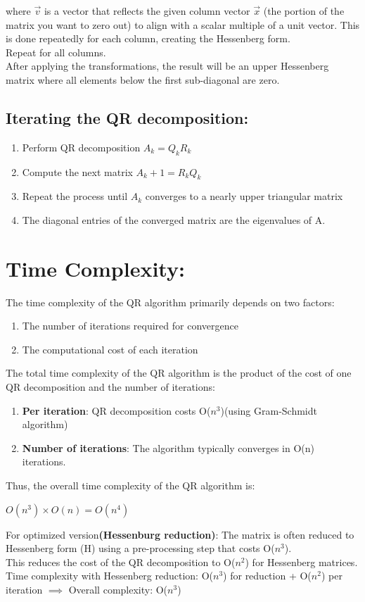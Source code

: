 \documentclass[journal]{IEEEtran}
\begin{document}
where $\vec{v}$ is a vector that reflects the given column vector $\vec{x}$ (the portion of the matrix you want to zero out) to align with a scalar multiple of a unit vector. This is done repeatedly for each column, creating the Hessenberg form.\\
Repeat for all columns.\\
After applying the transformations, the result will be an upper Hessenberg matrix where all elements below the first sub-diagonal are zero.\\


\subsection{Iterating the QR decomposition:}
\begin{enumerate}
    \item Perform QR decomposition $A_k=Q_kR_k$
    \item Compute the next matrix $A_k+1=R_kQ_k$
    \item Repeat the process until $A_k$ converges to a nearly upper triangular matrix 
    \item The diagonal entries of the converged matrix are the eigenvalues of A.
\end{enumerate}
\section{Time Complexity:}
The time complexity of the QR algorithm primarily depends on two factors:
\begin{enumerate}
    \item The number of iterations required for convergence
    \item The computational cost of each iteration
\end{enumerate}
The total time complexity of the QR algorithm is the product of the cost of one QR decomposition and the number of iterations:
\begin{enumerate}
    \item \textbf{Per iteration}: QR decomposition costs O($n^3$)(using Gram-Schmidt algorithm)
    \item \textbf{Number of iterations}: The algorithm typically converges in O(n) iterations.
\end{enumerate}
Thus, the overall time complexity of the QR algorithm is:
\begin{center}
    $O(n^3)\times O(n)=O(n^4)$
\end{center}
For optimized version\textbf{(Hessenburg reduction)}:
The matrix is often reduced to Hessenberg form (H) using a pre-processing step that costs O($n^3$).\\This reduces the cost of the QR decomposition to O($n^2$) for Hessenberg matrices.\\
Time complexity with Hessenberg reduction: O($n^3$) for reduction + O($n^2$) per iteration $\implies$ Overall complexity: O($n^3$)
\end{document}
